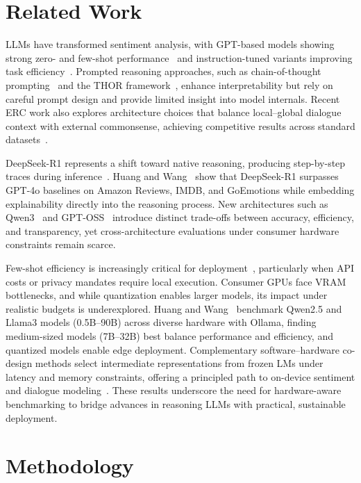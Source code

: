 \documentclass[conference]{IEEEtran}
\newcommand{\DeepSeekR}{DeepSeek-R1}
\newcommand{\QwendThree}{Qwen3}
\newcommand{\GPToss}{GPT-OSS}
\begin{document}
\section{Related Work}

LLMs have transformed sentiment analysis, with GPT-based models showing strong zero- and few-shot performance~\cite{brown2020language,zhang2023sentiment} and instruction-tuned variants improving task efficiency~\cite{ghatora2024sentiment}. 
Prompted reasoning approaches, such as chain-of-thought prompting~\cite{lu2024analysis,zhang2025enhancing} and the THOR framework~\cite{fei2023reasoning}, enhance interpretability but rely on careful prompt design and provide limited insight into model internals.
Recent ERC work also explores architecture choices that balance local–global dialogue context with external commonsense, achieving competitive results across standard datasets~\cite{yu2024dialogue}.

\DeepSeekR{} represents a shift toward native reasoning, producing step-by-step traces during inference~\cite{guo2025deepseek}. 
Huang and Wang~\cite{huang2025explainable} show that \DeepSeekR{} surpasses GPT-4o baselines on Amazon Reviews, IMDB, and GoEmotions while embedding explainability directly into the reasoning process. 
New architectures such as \QwendThree{}~\cite{yang2025qwen3} and \GPToss{}~\cite{gptoss2025} introduce distinct trade-offs between accuracy, efficiency, and transparency, yet cross-architecture evaluations under consumer hardware constraints remain scarce.

Few-shot efficiency is increasingly critical for deployment~\cite{huang2024automating,ipa2024bdsentillm}, particularly when API costs or privacy mandates require local execution. 
Consumer GPUs face VRAM bottlenecks, and while quantization enables larger models, its impact under realistic budgets is underexplored. 
Huang and Wang~\cite{huang2025llms} benchmark Qwen2.5 and Llama3 models (0.5B--90B) across diverse hardware with Ollama, finding medium-sized models (7B--32B) best balance performance and efficiency, and quantized models enable edge deployment. 
Complementary software–hardware co-design methods select intermediate representations from frozen LMs under latency and memory constraints, offering a principled path to on-device sentiment and dialogue modeling~\cite{pandelea2023selecting}. 
These results underscore the need for hardware-aware benchmarking to bridge advances in reasoning LLMs with practical, sustainable deployment.

\section{Methodology}
\end{document}
